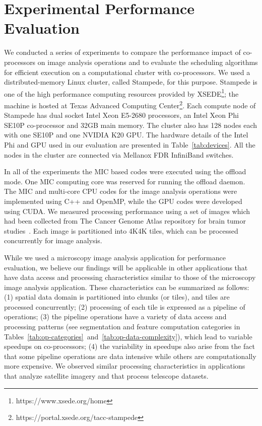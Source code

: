 \section{Experimental Performance Evaluation} \label{sec:results}
We conducted a series of experiments to compare the performance impact of 
co-processors on image analysis operations and to evaluate the 
scheduling algorithms for efficient execution on a computational cluster with 
co-processors. We used a distributed-memory Linux cluster, called Stampede, for this 
purpose. Stampede is one of the high performance computing resources provided by 
XSEDE\footnote{https://www.xsede.org/home}; the machine is hosted at Texas Advanced 
Computing Center\footnote{https://portal.xsede.org/tacc-stampede}. 
Each compute node of Stampede has dual socket Intel Xeon E5-2680 processors, an Intel 
Xeon Phi SE10P co-processor and 32GB main memory. The cluster also has 
128 nodes each with one SE10P and one NVIDIA K20 GPU. 
The hardware details of the Intel Phi and GPU used in our evaluation
are presented in Table~\ref{tab:devices}. All the nodes in the cluster 
are connected via Mellanox FDR InfiniBand switches. 

In all of the experiments the MIC based codes were executed using the offload mode. One MIC computing 
core was reserved for running the offload daemon. The MIC and multi-core CPU codes for the 
image analysis operations were implemented using C++ and OpenMP, while the GPU codes were 
developed using CUDA. We measured processing performance using a 
set of images which had been collected from The Cancer Genome Atlas repository for brain 
tumor studies~\cite{kong2013machine}. Each image is partitioned into 4K4K tiles, which 
can be processed concurrently for image analysis.

While we used a microscopy image analysis application for performance evaluation, we believe our 
findings will be applicable in other applications that have data access and processing 
characteristics similar to those of the microscopy image analysis application. These characteristics 
can be summarized as follows: (1) spatial data domain is partitioned into chunks (or tiles), and 
tiles are processed concurrently; (2) processing of each tile is expressed as a 
pipeline of operations; (3) the pipeline operations have a variety 
of data access and processing patterns (see segmentation and feature computation categories in 
Tables~\ref{tab:op-categories}~and~\ref{tab:op-data-complexity}), which lead to variable speedups on 
co-processors; (4) the variability in speedups also arise from the fact that some pipeline operations 
are data intensive while others are computationally more expensive. We observed similar 
processing characteristics in applications that analyze satellite imagery and that process telescope 
datasets. 

